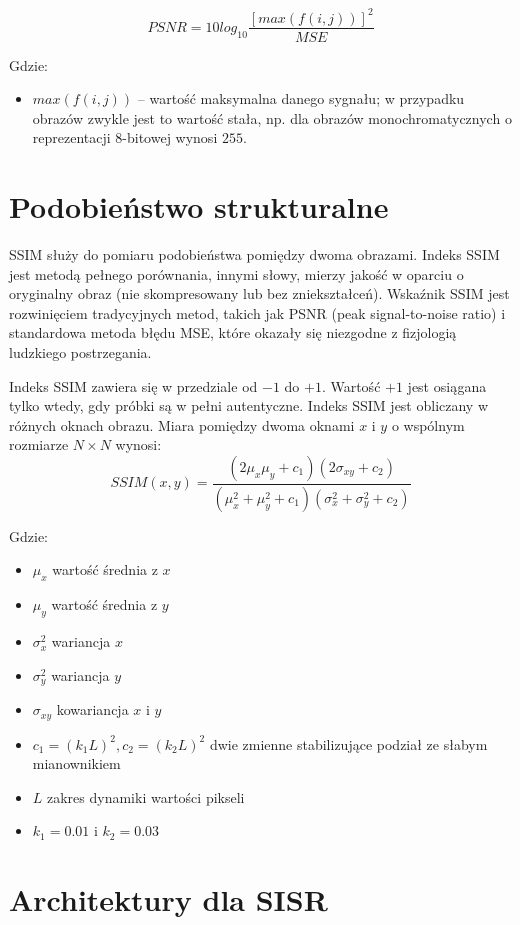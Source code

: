 \documentclass[a4paper,11pt, notitlepage ]{article}
\begin{document}
 	$$PSNR= 10 log_{10}{\frac{[max(f(i,j))]^2}{MSE}}$$
 	
 	Gdzie: 
 	\begin{itemize}
 		\item $max(f(i,j))$ – wartość maksymalna danego sygnału; w przypadku obrazów zwykle jest to wartość stała, np. dla obrazów monochromatycznych o reprezentacji 8-bitowej wynosi $255$.
 	\end{itemize}
 
	\section{Podobieństwo strukturalne}
	SSIM służy do pomiaru podobieństwa pomiędzy dwoma obrazami. Indeks SSIM jest metodą pełnego porównania, innymi słowy, mierzy jakość w oparciu o oryginalny obraz (nie skompresowany lub bez zniekształceń). Wskaźnik SSIM jest rozwinięciem tradycyjnych metod, takich jak PSNR (peak signal-to-noise ratio) i standardowa metoda błędu MSE, które okazały się niezgodne z fizjologią ludzkiego postrzegania. 
	
	Indeks SSIM zawiera się w przedziale od $-1$ do $+1$. Wartość $+1$ jest osiągana tylko wtedy, gdy próbki są w pełni autentyczne. Indeks SSIM jest obliczany w różnych oknach obrazu. Miara pomiędzy dwoma oknami $x$ i $y$ o wspólnym rozmiarze $N \times N$ wynosi:
	 $$SSIM(x,y)= \frac{(2\mu_x\mu_y+c_1)(2\sigma_{xy}+c_2)}{(\mu_x^2+\mu_y^2+c_1)(\sigma_x^2+\sigma_y^2+c_2)} $$ 
 	
 	Gdzie: 
 	\begin{itemize}
 		\item $\mu_x$ wartość średnia z $x$
 		\item $\mu_y$ wartość średnia z $y$
 		\item $\sigma_x^2$ wariancja $x$
 		\item $\sigma_y^2$ wariancja $y$
 		\item $\sigma_{xy}$ kowariancja $x$ i $y$
 		\item $c_1=(k_1L)^2, c_2=(k_2L)^2$ dwie zmienne stabilizujące podział ze słabym mianownikiem
 		\item $L$ zakres dynamiki wartości pikseli 
 		\item $k_1=0.01$ i $k_2=0.03$
 	\end{itemize}
 \newpage
	 \section{Architektury dla SISR}
\end{document}
